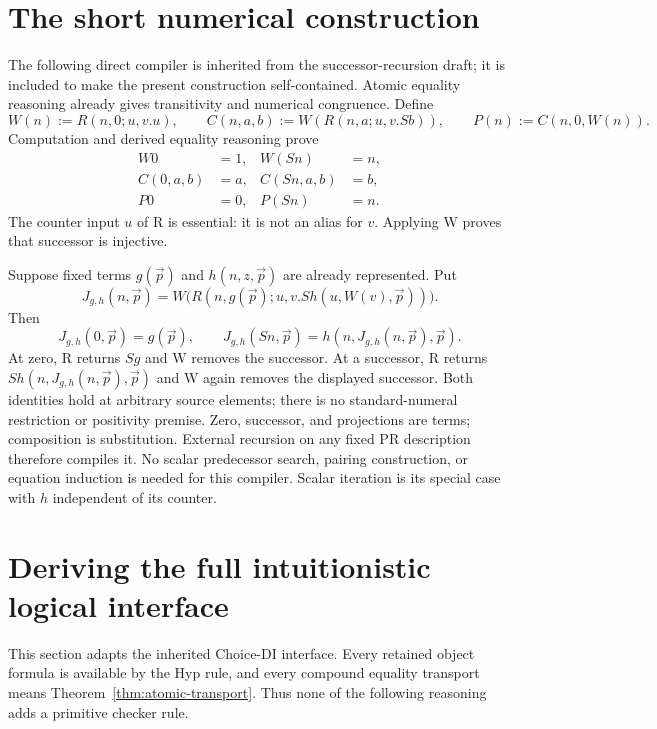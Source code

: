 \section{The short numerical construction}
\label{sec:numerical}

The following direct compiler is inherited from the successor-recursion
draft\cite{recursor}; it is included to make the present construction
self-contained. Atomic equality reasoning already gives transitivity
and numerical congruence. Define
\[
 W(n):=R(n,0;u,v.u),\qquad
 C(n,a,b):=W(R(n,a;u,v.Sb)),\qquad
 P(n):=C(n,0,W(n)).
\]
Computation and derived equality reasoning prove
\begin{align*}
 W0&=1,&W(Sn)&=n,\\
 C(0,a,b)&=a,&C(Sn,a,b)&=b,\\
 P0&=0,&P(Sn)&=n.
\end{align*}
The counter input $u$ of R is essential: it is not an alias for $v$.
Applying W proves that successor is injective.

Suppose fixed terms $g(\vec p)$ and $h(n,z,\vec p)$ are already
represented. Put
\[
 J_{g,h}(n,\vec p)=
 W\bigl(R(n,g(\vec p);u,v.S h(u,W(v),\vec p))\bigr).
 \tag{Compiler}\label{eq:compiler}
\]
Then
\[
 J_{g,h}(0,\vec p)=g(\vec p),\qquad
 J_{g,h}(Sn,\vec p)=h(n,J_{g,h}(n,\vec p),\vec p).
\]
At zero, R returns $Sg$ and W removes the successor. At a successor,
R returns $S h(n,J_{g,h}(n,\vec p),\vec p)$ and W again removes
the displayed successor. Both identities hold at arbitrary source
elements; there is no standard-numeral restriction or positivity premise.
Zero, successor, and projections are terms; composition is substitution.
External recursion on any fixed PR description therefore compiles it.
No scalar predecessor search, pairing construction, or equation induction
is needed for this compiler. Scalar iteration is its special case with
$h$ independent of its counter.

\section{Deriving the full intuitionistic logical interface}
\label{sec:logic}

This section adapts the inherited Choice-DI interface\cite{elimination,recursor}.
Every retained object formula is available by the Hyp rule, and
every compound equality transport means Theorem~\ref{thm:atomic-transport}.
Thus none of the following reasoning adds a primitive checker rule.

